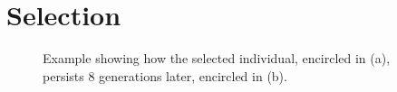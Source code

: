 \section{Selection}
\begin{figure}[ht]
\centering
{}
\hfil
{}
\caption{Example showing how the selected individual, encircled in (a), persists 8 generations later, encircled in (b).}
\label{fig:selection}
\end{figure}
